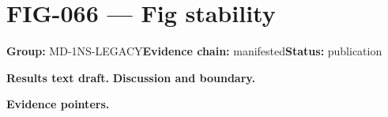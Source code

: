 \clearpage
\section{FIG-066 --- Fig stability}
\label{figpage:fig-066}
\textbf{Group:} MD-1NS-LEGACY\quad \textbf{Evidence chain:} manifested\quad \textbf{Status:} publication

\textbf{Results text draft.} 
\textbf{Discussion and boundary.} 


\textbf{Evidence pointers.}



\vfill
